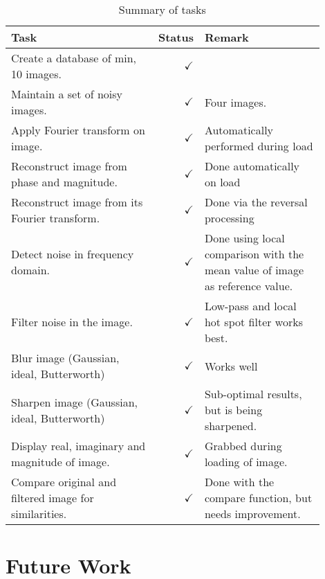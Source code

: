 \begin{table}[h]
	\begin{tabular}{p{0.5\linewidth} r p{0.4\linewidth}}
		\bf{Task} & \bf{Status} & \bf{Remark} \\[2mm]\hline
	Create a database of min, 10 images.					& $\boxed{\checkmark}$& \\
	
	Maintain a set of noisy images.								& $\boxed{\checkmark}$& 
		Four images.\\

	Apply Fourier transform on image.							& $\boxed{\checkmark}$&
		Automatically performed during load \\

	Reconstruct image from phase and magnitude.		& $\boxed{\checkmark}$&
		Done automatically on load\\
	
	Reconstruct image from its Fourier transform.	& $\boxed{\checkmark}$&
		Done via the reversal processing\\
	
	Detect noise in frequency domain.							& $\boxed{\checkmark}$& Done
		using local comparison with the mean value of image as reference value.\\
	
	Filter noise in the image.										& $\boxed{\checkmark}$& Low-pass
		and local hot spot filter works best.\\
	
	Blur image (Gaussian, ideal, Butterworth)			& $\boxed{\checkmark}$&
		Works well\\
	
	Sharpen image (Gaussian, ideal, Butterworth)	& $\boxed{\checkmark}$&
		Sub-optimal results, but is being sharpened.\\
	
	Display real, imaginary and magnitude of image.				& $\boxed{\checkmark}$&
		Grabbed during loading of image.\\
	
	Compare original and filtered image for similarities.	& $\boxed{\checkmark}$&
	Done with the compare function, but needs improvement.	\\[2mm]\hline
\end{tabular}
	\caption{Summary of tasks}\label{tab:summary}
\end{table}




\section{Future Work}\label{sec:futurework}
